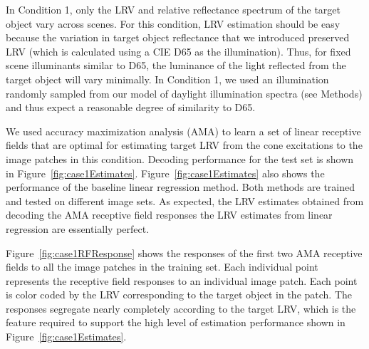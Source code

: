 \documentclass{jov}
\begin{document}
In Condition 1, only the LRV and relative reflectance spectrum of the target object vary across scenes.
For this condition, LRV estimation should be easy because the variation in target object reflectance that we introduced
preserved LRV (which is calculated using a CIE D65 as the illumination).
Thus, for fixed scene illuminants similar to D65, the luminance of the light reflected from the target object will vary minimally.
In Condition 1, we used an illumination randomly sampled from our model of daylight illumination spectra (see Methods) and thus expect a reasonable degree of similarity to D65.

We used accuracy maximization analysis (AMA) to learn a set of linear receptive fields that are optimal for estimating target LRV from the cone excitations to the image patches in this condition. 
Decoding performance for the test set is shown in Figure~\ref{fig:case1Estimates}. 
Figure~\ref{fig:case1Estimates} also shows the performance of the baseline linear regression method. 
Both methods are trained and tested on different image sets.
As expected, the LRV estimates obtained from decoding the AMA receptive field responses the LRV estimates from linear regression are essentially perfect.

Figure~\ref{fig:case1RFResponse} shows the responses of the first two AMA receptive fields to all the image patches in the training set.
Each individual point represents the receptive field responses to an individual image patch.
Each point is color coded by the LRV corresponding to the target object in the patch.
The responses segregate nearly completely according to the target LRV, which is the feature required to support the high level 
of estimation performance shown in Figure~\ref{fig:case1Estimates}.
\end{document}
